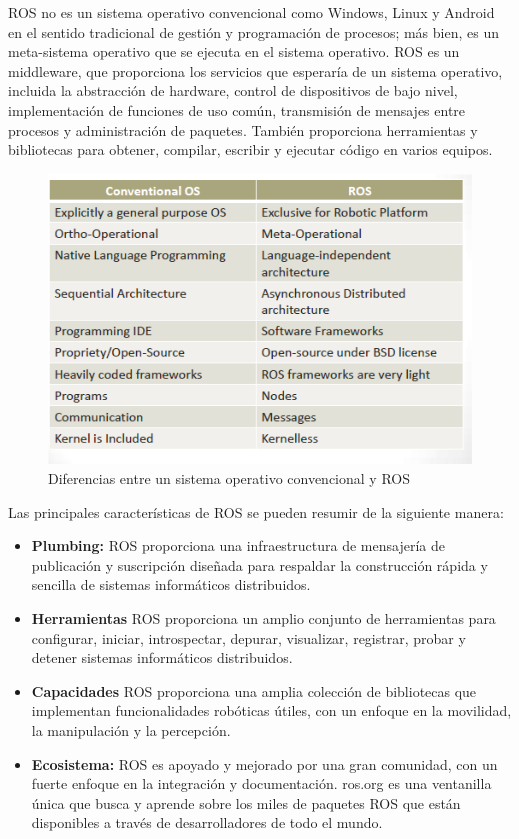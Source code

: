        ROS no es un sistema operativo convencional como Windows, Linux y Android en el sentido tradicional de gestión y programación de procesos; más bien, es un meta-sistema operativo que se ejecuta en el sistema operativo. ROS es un middleware, que proporciona los servicios que esperaría de un sistema operativo, incluida la abstracción de hardware, control de dispositivos de bajo nivel, implementación de funciones de uso común, transmisión de mensajes entre procesos y administración de paquetes. También proporciona herramientas y bibliotecas para obtener, compilar, escribir y ejecutar código en varios equipos.
       
        \begin{figure}[htb]
            \centering
            \includegraphics[width=0.8\linewidth]{Main/Chapter3/Images3/3-4/diferencia-ROS-SO.png}
            \caption{Diferencias entre un sistema operativo convencional y ROS}
            \label{f:Cap3-4_diferencias_ros_so}
        \end{figure}
        
        Las principales características de ROS se pueden resumir de la siguiente manera:
        
        \begin{itemize}
            \item \textbf{Plumbing:} ROS proporciona una infraestructura de mensajería de publicación y suscripción diseñada para respaldar la construcción rápida y sencilla de sistemas informáticos distribuidos.
            \item \textbf{Herramientas} ROS proporciona un amplio conjunto de herramientas para configurar, iniciar, introspectar, depurar, visualizar, registrar, probar y detener sistemas informáticos distribuidos.
            \item \textbf{Capacidades} ROS proporciona una amplia colección de bibliotecas que implementan funcionalidades robóticas útiles, con un enfoque en la movilidad, la manipulación y la percepción.
            \item \textbf{Ecosistema:} ROS es apoyado y mejorado por una gran comunidad, con un fuerte enfoque en la integración y documentación. ros.org es una ventanilla única que busca y aprende sobre los miles de paquetes ROS que están disponibles a través de desarrolladores de todo el mundo.
        \end{itemize}
        
